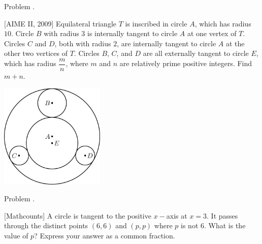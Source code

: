 \documentclass[9pt]{beamer}
\newcounter{problem}[section]
\begin{document}
\begin{frame}[t, fragile]{Problem \thesection.\theproblem}
    \begin{block}{}[AIME II, 2009]
    Equilateral triangle $T$ is inscribed in circle $A$, which has radius $10$. Circle $B$ with radius $3$ is internally tangent to circle $A$ at one vertex of $T$. Circles $C$ and $D$, both with radius $2$, are internally tangent to circle $A$ at the other two vertices of $T$. Circles $B$, $C$, and $D$ are all externally tangent to circle $E$, which has radius $\dfrac mn$, where $m$ and $n$ are relatively prime positive integers. Find $m+n$.
    \end{block}
    \begin{center}
        \includegraphics[height=50mm,scale=0.25]{images/2009_AIME2_5.png}
    \end{center}
	

\end{frame}

\begin{frame}[t, fragile]{Problem \thesection.\theproblem}
    \begin{block}{}[Mathcounts]
    A circle is tangent to the positive $ x- $axis at $ x = 3 $. It passes through the distinct points $ (6, 6) $ and $ (p, p) $ where $ p $ is not 6. What is the value of $ p $? Express your answer as a common fraction.
	
    \end{block}
\end{frame}
\end{document}
